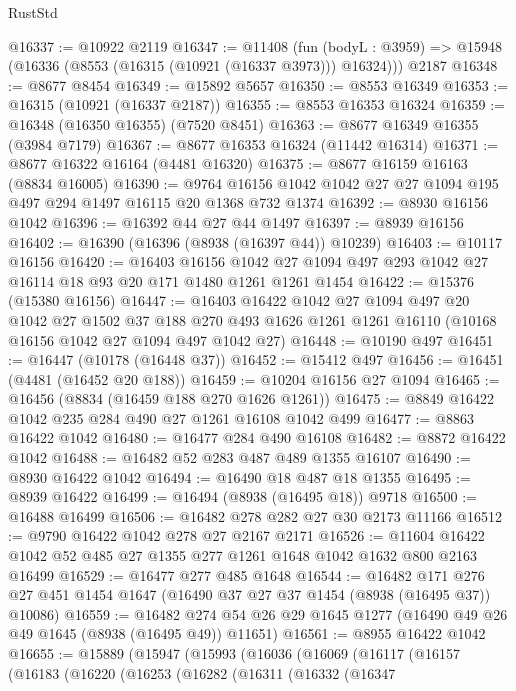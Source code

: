 \begin{lexlean}{RustStd}
\begin{coremodule}
@16337 := @10922 @2119
@16347 := @11408
    (fun (bodyL : @3959) => @15948 (@16336 (@8553 (@16315 (@10921 (@16337 @3973))) @16324)))
    @2187
@16348 := @8677 @8454
@16349 := @15892 @5657
@16350 := @8553 @16349
@16353 := @16315 (@10921 (@16337 @2187))
@16355 := @8553 @16353 @16324
@16359 := @16348 (@16350 @16355) (@7520 @8451)
@16363 := @8677 @16349 @16355 (@3984 @7179)
@16367 := @8677 @16353 @16324 (@11442 @16314)
@16371 := @8677 @16322 @16164 (@4481 @16320)
@16375 := @8677 @16159 @16163 (@8834 @16005)
@16390 := @9764 @16156 @1042 @1042 @27 @27 @1094 @195 @497 @294 @1497 @16115 @20 @1368 @732 @1374
@16392 := @8930 @16156 @1042
@16396 := @16392 @44 @27 @44 @1497
@16397 := @8939 @16156
@16402 := @16390 (@16396 (@8938 (@16397 @44)) @10239)
@16403 := @10117 @16156
@16420 := @16403
    @16156
    @1042
    @27
    @1094
    @497
    @293
    @1042
    @27
    @16114
    @18
    @93
    @20
    @171
    @1480
    @1261
    @1261
    @1454
@16422 := @15376 (@15380 @16156)
@16447 := @16403
    @16422
    @1042
    @27
    @1094
    @497
    @20
    @1042
    @27
    @1502
    @37
    @188
    @270
    @493
    @1626
    @1261
    @1261
    @16110
    (@10168 @16156 @1042 @27 @1094 @497 @1042 @27)
@16448 := @10190 @497
@16451 := @16447 (@10178 (@16448 @37))
@16452 := @15412 @497
@16456 := @16451 (@4481 (@16452 @20 @188))
@16459 := @10204 @16156 @27 @1094
@16465 := @16456 (@8834 (@16459 @188 @270 @1626 @1261))
@16475 := @8849 @16422 @1042 @235 @284 @490 @27 @1261 @16108 @1042 @499
@16477 := @8863 @16422 @1042
@16480 := @16477 @284 @490 @16108
@16482 := @8872 @16422 @1042
@16488 := @16482 @52 @283 @487 @489 @1355 @16107
@16490 := @8930 @16422 @1042
@16494 := @16490 @18 @487 @18 @1355
@16495 := @8939 @16422
@16499 := @16494 (@8938 (@16495 @18)) @9718
@16500 := @16488 @16499
@16506 := @16482 @278 @282 @27 @30 @2173 @11166
@16512 := @9790 @16422 @1042 @278 @27 @2167 @2171
@16526 := @11604 @16422 @1042 @52 @485 @27 @1355 @277 @1261 @1648 @1042 @1632 @800 @2163 @16499
@16529 := @16477 @277 @485 @1648
@16544 := @16482
    @171
    @276
    @27
    @451
    @1454
    @1647
    (@16490 @37 @27 @37 @1454 (@8938 (@16495 @37)) @10086)
@16559 := @16482 @274 @54 @26 @29 @1645 @1277 (@16490 @49 @26 @49 @1645 (@8938 (@16495 @49)) @11651)
@16561 := @8955 @16422 @1042
@16655 := @15889
    (@15947
      (@15993
        (@16036
          (@16069
            (@16117
              (@16157
                (@16183
                  (@16220
                    (@16253
                      (@16282
                        (@16311
                          (@16332
                            (@16347

\end{coremodule}
\end{lexlean}
